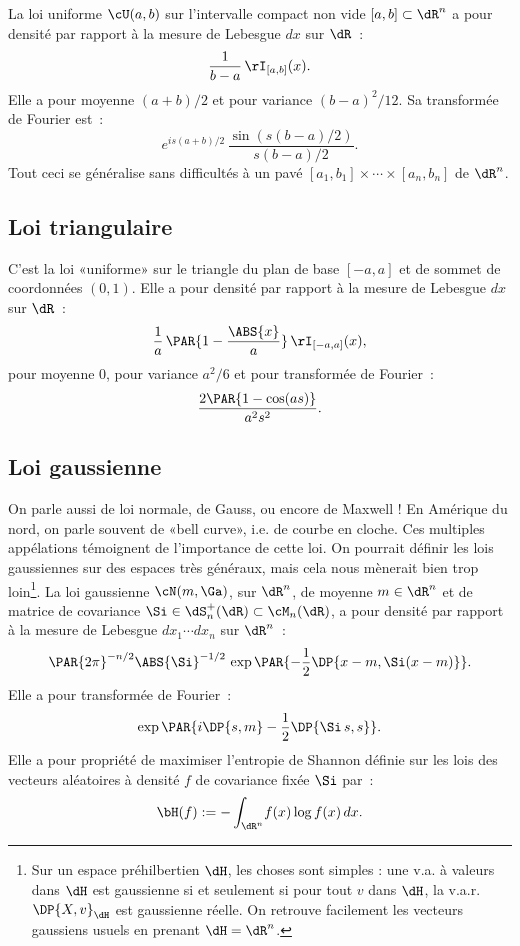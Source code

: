 La loi uniforme $\cU(a,b)$ sur l'intervalle compact non vide $[a,b]\subset\dR^n$ a
pour densité par rapport à la mesure de Lebesgue $dx$ sur $\dR$~:
$$
\frac{1}{b-a}\,\rI_{[a,b]}(x).
$$
Elle a pour moyenne $(a+b)/2$ et pour variance $(b-a)^2/12$. Sa transformée
de Fourier est~:
$$
e^{is(a+b)/2}\,\frac{\sin(s(b-a)/2)}{s(b-a)/2}.
$$
Tout ceci se généralise sans difficultés à un pavé $[a_1,b_1]\times\cdots\times[a_n,b_n]$ de
$\dR^n$.

%
\subsection{Loi triangulaire}\label{ss:loi:triangulaire}
%

C'est la loi «uniforme» sur le triangle du plan de base $[-a,a]$ et de sommet
de coordonnées $(0,1)$. Elle a pour densité par rapport à la mesure de
Lebesgue $dx$ sur $\dR$~:
$$
\frac{1}{a}\,\PAR{1-\frac{\ABS{x}}{a}}\,\rI_{[-a,a]}(x),
$$
pour moyenne $0$, pour variance $a^2/6$ et pour transformée de Fourier~:
$$
\frac{2\PAR{1-\cos(as)}}{a^2s^2}.
$$

%
\subsection{Loi gaussienne}\label{ss:loi:gaussienne}
%

On parle aussi de loi normale, de Gauss, ou encore de Maxwell ! En Amérique du
nord, on parle souvent de «bell curve», i.e. de courbe en cloche. Ces
multiples appélations témoignent de l'importance de cette loi. On pourrait
définir les lois gaussiennes sur des espaces très généraux, mais cela nous
mènerait bien trop loin\footnote{Sur un espace préhilbertien $\dH$, les choses
  sont simples : une v.a. à valeurs dans $\dH$ est gaussienne si et seulement
  si pour tout $v$ dans $\dH$, la v.a.r. $\DP{X,v}_\dH$ est gaussienne réelle.
  On retrouve facilement les vecteurs gaussiens usuels en prenant
  $\dH=\dR^n$.}.  La loi gaussienne $\cN(m,\Ga)$, sur $\dR^n$, de moyenne
$m\in\dR^n$ et de matrice de covariance $\Si\in\dS_n^+(\dR)\subset \cM_n(\dR)$, a pour
densité par rapport à la mesure de Lebesgue $dx_1\cdots dx_n$ sur $\dR^n$~:
$$
\PAR{2\pi}^{-n/2}\ABS{\Si}^{-1/2}\,\exp\PAR{-\frac{1}{2}\DP{x-m,\Si (x-m)}}.
$$
Elle a pour transformée de Fourier~:
$$
\exp\PAR{i\DP{s,m}-\frac{1}{2}\DP{\Si\,s,s}}.
$$
Elle a pour propriété de maximiser l'entropie de Shannon définie sur les
lois des vecteurs aléatoires à densité $f$ de covariance fixée $\Si$ par~:
$$
\bH(f):=-\int_{\dR^n}\!f(x)\log f(x)\,dx.
$$

